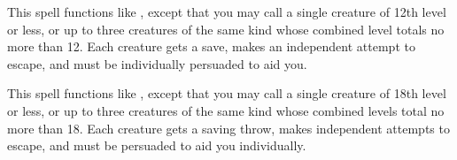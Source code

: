 \begin{spelleffect}
This spell functions like , except that you may call a single creature of 12th level or less, or up to three creatures of the same kind whose combined level totals no more than 12. Each creature gets a save, makes an independent attempt to escape, and must be individually persuaded to aid you.
\end{spelleffect}

\begin{spelleffect}
This spell functions like , except that you may call a single creature of 18th level or less, or up to three creatures of the same kind whose combined levels total no more than 18. Each creature gets a saving throw, makes independent attempts to escape, and must be persuaded to aid you individually.
\end{spelleffect}

